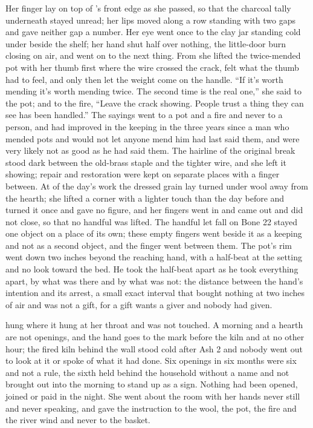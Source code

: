 Her finger lay on top of 's front edge as she passed, so that the charcoal tally underneath stayed unread; her lips moved along a row standing with two gaps and gave neither gap a number. Her eye went once to the clay jar standing cold under  beside the shelf; her hand shut half over nothing, the little-door burn closing on air, and went on to the next thing. From  she lifted the twice-mended pot with her thumb first where the wire crossed the crack, felt what the thumb had to feel, and only then let the weight come on the handle. “If it's worth mending it's worth mending twice. The second time is the real one,” she said to the pot; and to the fire, “Leave the crack showing. People trust a thing they can see has been handled.” The sayings went to a pot and a fire and never to a person, and had improved in the keeping in the three years since a man who mended pots and would not let anyone mend him had last said them, and were very likely not as good as he had said them. The hairline of the original break stood dark between the old-brass staple and the tighter wire, and she left it showing; repair and restoration were kept on separate places with a finger between. At  of the day's work the dressed grain lay turned under wool away from the hearth; she lifted a corner with a lighter touch than the day before and turned it once and gave no figure, and her fingers went in and came out and did not close, so that no handful was lifted. The handful let fall on Bone 22 stayed one object on a place of its own; these empty fingers went beside it as a keeping and not as a second object, and the finger went between them. The pot's rim went down two inches beyond the reaching hand, with a half-beat at the setting and no look toward the bed. He took the half-beat apart as he took everything apart, by what was there and by what was not: the distance between the hand's intention and its arrest, a small exact interval that bought nothing at two inches of air and was not a gift, for a gift wants a giver and nobody had given.

 hung where it hung at her throat and was not touched. A morning and a hearth are not openings, and the hand goes to the mark before the kiln and at no other hour; the fired kiln behind the wall stood cold after Ash 2 and nobody went out to look at it or spoke of what it had done. Six openings in six months were six and not a rule, the sixth held behind the household without a name and not brought out into the morning to stand up as a sign. Nothing had been opened, joined or paid in the night. She went about the room with her hands never still and never speaking, and gave the instruction to the wool, the pot, the fire and the river wind and never to the basket.

